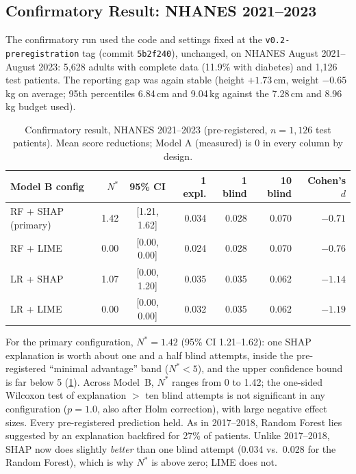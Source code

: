 \documentclass[sigconf,nonacm]{acmart}
\begin{document}


\subsection{Confirmatory Result: NHANES 2021--2023}
\label{sec:confirmatory-results}

The confirmatory run used the code and settings fixed at the
\texttt{v0.2-preregistration} tag (commit \texttt{5b2f240}), unchanged,
on NHANES August 2021--August 2023: 5{,}628 adults with complete data
(11.9\% with diabetes) and 1{,}126 test patients.  The reporting gap was
again stable (height $+1.73$\,cm, weight $-0.65$\,kg on average;
95th percentiles 6.84\,cm and 9.04\,kg against the 7.28\,cm and
8.96\,kg budget used).

\begin{table}[t]
  \centering
  \caption{Confirmatory result, NHANES 2021--2023 (pre-registered,
           $n = 1{,}126$ test patients). Mean score reductions; Model A
           (measured) is 0 in every column by design.}
  \label{tab:confirmatory}
  \small
  \begin{tabular}{lrcrrrr}
    \toprule
    Model B config & $N^*$ & 95\% CI & 1 expl. & 1 blind & 10 blind & Cohen's $d$ \\
    \midrule
    RF + SHAP (primary) & 1.42 & [1.21, 1.62] & 0.034 & 0.028 & 0.070 & $-0.71$ \\
    RF + LIME & 0.00 & [0.00, 0.00] & 0.024 & 0.028 & 0.070 & $-0.76$ \\
    LR + SHAP & 1.07 & [0.00, 1.20] & 0.035 & 0.035 & 0.062 & $-1.14$ \\
    LR + LIME & 0.00 & [0.00, 0.00] & 0.032 & 0.035 & 0.062 & $-1.19$ \\
    \bottomrule
  \end{tabular}
\end{table}

For the primary configuration, $N^* = 1.42$ (95\% CI 1.21--1.62): one
SHAP explanation is worth about one and a half blind attempts, inside
the pre-registered ``minimal advantage'' band ($N^* < 5$), and the
upper confidence bound is far below 5 (\cref{tab:confirmatory}).
Across Model~B, $N^*$ ranges from 0 to 1.42; the one-sided Wilcoxon
test of explanation $>$ ten blind attempts is not significant in any
configuration ($p = 1.0$, also after Holm correction), with large
negative effect sizes.  Every pre-registered prediction held.  As in
2017--2018, Random Forest lies suggested by an explanation backfired
for 27\% of patients.  Unlike 2017--2018, SHAP now does slightly
\emph{better} than one blind attempt (0.034 vs.\ 0.028 for the Random
Forest), which is why $N^*$ is above zero; LIME does not.
\end{document}

